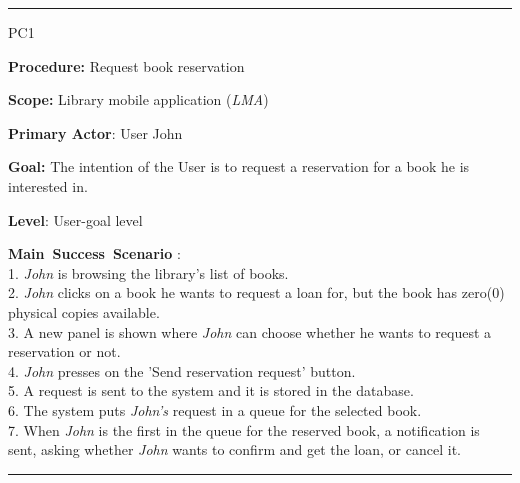 \vspace{0.5cm}
\hrule
\begin{lyxlist}{PC1}
\small{
\item [\textbf{Procedure:}] Request book reservation
\item [\textbf{Scope:}] Library mobile application (\emph{LMA})
\item [\textbf{Primary Actor}:] User John
\item [\textbf{Goal:}] The intention of the User is to request a reservation for
a book he is interested in.
\item [\textbf{Level}:] User-goal level
\item [\textbf{Main~Success~Scenario}]:\\
1. \emph{John} is browsing the library's list of books. \\
2. \emph{John} clicks on a book he wants to request a loan for, but the book has
zero(0) physical copies available.\\
3. A new panel is shown where \emph{John} can choose whether he wants to
request a reservation or not. \\
4. \emph{John} presses on the 'Send reservation request' button. \\
5. A request is sent to the system and it is stored in the database. \\
6. The system puts \emph{John's} request in a queue for the selected book. \\ 
7. When \emph{John} is the first in the queue for the reserved book, a
notification is sent, asking whether \emph{John} wants to confirm and get the
loan, or cancel it. \\

}

\end{lyxlist}
\hrule


